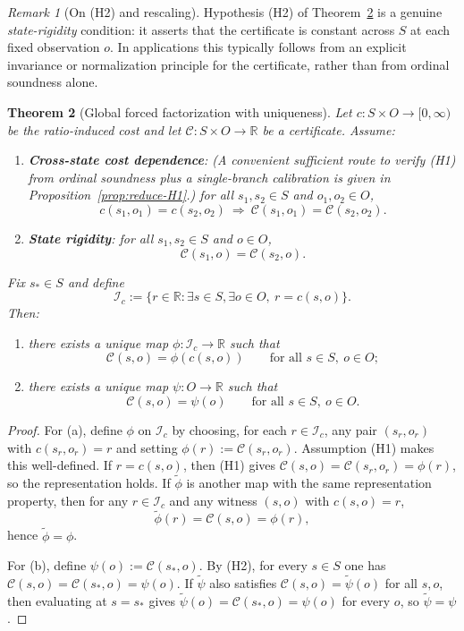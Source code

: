 \documentclass[11pt,reqno]{amsart}
\newtheorem{theorem}{Theorem}[section]
\theoremstyle{definition}
\theoremstyle{remark}
\newtheorem{remark}[theorem]{Remark} %
\newcommand{\R}{\mathbb{R}}
\newcommand{\1}{\mathbf{1}}
\begin{document}
\begin{remark}[On \textup{(H2)} and rescaling]
Hypothesis \textup{(H2)} of Theorem~\ref{thm:forced-factor-unique} is a genuine \emph{state-rigidity} condition:
it asserts that the certificate is constant across $S$ at each fixed observation $o$.
In applications this typically follows from an explicit invariance or normalization principle for the certificate,
rather than from ordinal soundness alone.
\end{remark}


\begin{theorem}[Global forced factorization with uniqueness]\label{thm:forced-factor-unique}
Let $c:S\times O\to[0,\infty)$ be the ratio-induced cost and let $\mathcal C:S\times O\to\R$ be a certificate.
Assume:
\begin{enumerate}[label=\textup{(H\arabic*)},leftmargin=2.2em]
\item \textbf{Cross-state cost dependence}: (A convenient sufficient route to verify \textup{(H1)} from ordinal soundness plus a single-branch calibration is given in Proposition~\ref{prop:reduce-H1}.)
for all $s_1,s_2\in S$ and $o_1,o_2\in O$,
\[
c(s_1,o_1)=c(s_2,o_2)\ \Longrightarrow\ \mathcal C(s_1,o_1)=\mathcal C(s_2,o_2).
\]
\item \textbf{State rigidity}: for all $s_1,s_2\in S$ and $o\in O$,
\[
\mathcal C(s_1,o)=\mathcal C(s_2,o).
\]
\end{enumerate}
Fix $s_\ast\in S$ and define
\[
\mathcal I_c:=\{r\in\R:\exists s\in S,\exists o\in O,\ r=c(s,o)\}.
\]
Then:
\begin{enumerate}[label=\textup{(\alph*)},leftmargin=2.2em]
\item there exists a unique map $\phi:\mathcal I_c\to\R$ such that
\[
\mathcal C(s,o)=\phi(c(s,o))\qquad\text{for all }s\in S,\ o\in O;
\]
\item there exists a unique map $\psi:O\to\R$ such that
\[
\mathcal C(s,o)=\psi(o)\qquad\text{for all }s\in S,\ o\in O.
\]
\end{enumerate}
\end{theorem}

\begin{proof}
For (a), define $\phi$ on $\mathcal I_c$ by choosing, for each $r\in\mathcal I_c$, any pair $(s_r,o_r)$ with
$c(s_r,o_r)=r$ and setting $\phi(r):=\mathcal C(s_r,o_r)$.
Assumption (H1) makes this well-defined.
If $r=c(s,o)$, then (H1) gives
$\mathcal C(s,o)=\mathcal C(s_r,o_r)=\phi(r)$, so the representation holds.
If $\widetilde\phi$ is another map with the same representation property, then for any
$r\in\mathcal I_c$ and any witness $(s,o)$ with $c(s,o)=r$,
\[
\widetilde\phi(r)=\mathcal C(s,o)=\phi(r),
\]
hence $\widetilde\phi=\phi$.

For (b), define $\psi(o):=\mathcal C(s_\ast,o)$.
By (H2), for every $s\in S$ one has
$\mathcal C(s,o)=\mathcal C(s_\ast,o)=\psi(o)$.
If $\widetilde\psi$ also satisfies $\mathcal C(s,o)=\widetilde\psi(o)$ for all $s,o$, then
evaluating at $s=s_\ast$ gives
$\widetilde\psi(o)=\mathcal C(s_\ast,o)=\psi(o)$ for every $o$, so $\widetilde\psi=\psi$.
\end{proof}
\end{document}
